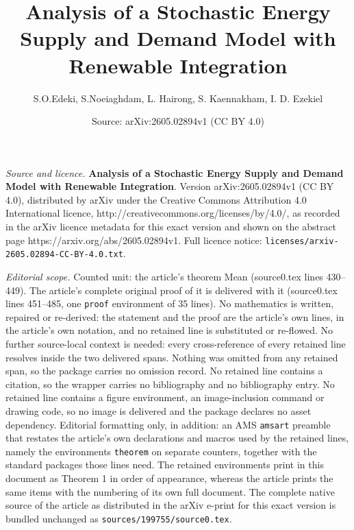 \documentclass[10pt,a4paper]{amsart}
\title{\textbf{Analysis of a Stochastic Energy Supply and Demand Model with Renewable Integration}}
\author{S.O.Edeki, S.Noeiaghdam, L. Hairong, S. Kaennakham, I. D. Ezekiel}
\date{Source: arXiv:2605.02894v1 (CC BY 4.0)}
\begin{document}
\maketitle

\noindent\emph{Source and licence.} \textbf{Analysis of a Stochastic Energy Supply and Demand Model with Renewable Integration}. Version arXiv:2605.02894v1 (CC BY 4.0), distributed by arXiv under the Creative Commons Attribution 4.0 International licence, http://creativecommons.org/licenses/by/4.0/, as recorded in the arXiv licence metadata for this exact version and shown on the abstract page https://arxiv.org/abs/2605.02894v1. Full licence notice: \texttt{licenses/arxiv-2605.02894-CC-BY-4.0.txt}.\par\smallskip

\noindent\textit{Editorial scope.} Counted unit: the article's theorem Mean (source0.tex lines 430--449). The article's complete original proof of it is delivered with it (source0.tex lines 451--485, one \texttt{proof} environment of 35 lines). No mathematics is written, repaired or re-derived: the statement and the proof are the article's own lines, in the article's own notation, and no retained line is substituted or re-flowed.  No further source-local context is needed: every cross-reference of every retained line resolves inside the two delivered spans.  Nothing was omitted from any retained span, so the package carries no omission record.  No retained line contains a citation, so the wrapper carries no bibliography and no bibliography entry.  No retained line contains a figure environment, an image-inclusion command or drawing code, so no image is delivered and the package declares no asset dependency.  Editorial formatting only, in addition: an AMS \texttt{amsart} preamble that restates the article's own declarations and macros used by the retained lines, namely the environments \texttt{theorem} on separate counters, together with the standard packages those lines need.  The retained environments print in this document as Theorem 1 in order of appearance, whereas the article prints the same items with the numbering of its own full document.  The complete native source of the article as distributed in the arXiv e-print for this exact version is bundled unchanged as \texttt{sources/199755/source0.tex}.
\end{document}
